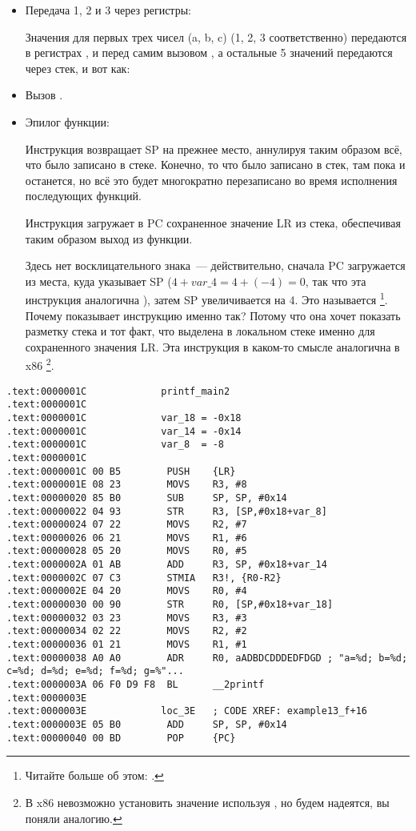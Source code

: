 \begin{itemize}
\item Передача 1, 2 и 3 через регистры:

Значения для первых трех чисел (a, b, c) (1, 2, 3 соответственно) передаются в регистрах 
,  и  перед самим вызовом \printf, а остальные 5 значений передаются через стек, и вот как:

\item Вызов \printf.

\item Эпилог функции:

Инструкция  возвращает \ac{SP} на прежнее место, 
аннулируя таким образом всё, что было записано в стеке.
Конечно, то что было записано в стек, там пока и останется, но всё это будет многократно 
перезаписано во время исполнения последующих функций.

Инструкция  загружает в \ac{PC} 
сохраненное значение \ac{LR} из стека, обеспечивая таким образом выход из функции.

Здесь нет восклицательного знака~--- действительно, сначала \ac{PC} загружается из места, куда указывает \ac{SP}
($4+var\_4=4+(-4)=0$, так что эта инструкция аналогична ), затем \ac{SP} увеличивается 
на 4.
Это называется \footnote{Читайте больше об этом: .}.
Почему \IDA показывает инструкцию именно так?
Потому что она хочет показать разметку стека и тот факт, что  выделена в локальном стеке именно для сохраненного
значения \ac{LR}.
Эта инструкция в каком-то смысле аналогична  в x86
\footnote{В x86 невозможно установить значение  используя \POP, но будем надеятся, вы поняли аналогию.}.

\end{itemize}

\myparagraph{\OptimizingKeilVI: \ThumbMode}

\begin{lstlisting}
.text:0000001C             printf_main2
.text:0000001C
.text:0000001C             var_18 = -0x18
.text:0000001C             var_14 = -0x14
.text:0000001C             var_8  = -8
.text:0000001C
.text:0000001C 00 B5        PUSH    {LR}
.text:0000001E 08 23        MOVS    R3, #8
.text:00000020 85 B0        SUB     SP, SP, #0x14
.text:00000022 04 93        STR     R3, [SP,#0x18+var_8]
.text:00000024 07 22        MOVS    R2, #7
.text:00000026 06 21        MOVS    R1, #6
.text:00000028 05 20        MOVS    R0, #5
.text:0000002A 01 AB        ADD     R3, SP, #0x18+var_14
.text:0000002C 07 C3        STMIA   R3!, {R0-R2}
.text:0000002E 04 20        MOVS    R0, #4
.text:00000030 00 90        STR     R0, [SP,#0x18+var_18]
.text:00000032 03 23        MOVS    R3, #3
.text:00000034 02 22        MOVS    R2, #2
.text:00000036 01 21        MOVS    R1, #1
.text:00000038 A0 A0        ADR     R0, aADBDCDDDEDFDGD ; "a=%d; b=%d; c=%d; d=%d; e=%d; f=%d; g=%"...
.text:0000003A 06 F0 D9 F8  BL      __2printf
.text:0000003E
.text:0000003E             loc_3E   ; CODE XREF: example13_f+16
.text:0000003E 05 B0        ADD     SP, SP, #0x14
.text:00000040 00 BD        POP     {PC}
\end{lstlisting}

